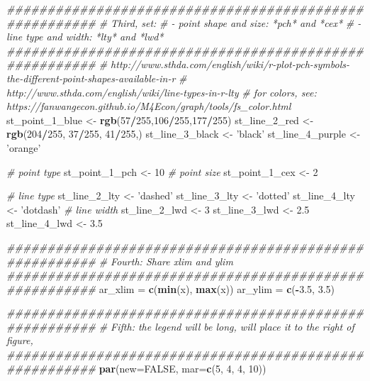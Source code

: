 \documentclass[
]{book}
\newenvironment{Shaded}{\begin{snugshade}}{\end{snugshade}}
\newcommand{\CommentTok}[1]{\textcolor[rgb]{0.56,0.35,0.01}{\textit{#1}}}
\newcommand{\DataTypeTok}[1]{\textcolor[rgb]{0.13,0.29,0.53}{#1}}
\newcommand{\DecValTok}[1]{\textcolor[rgb]{0.00,0.00,0.81}{#1}}
\newcommand{\FloatTok}[1]{\textcolor[rgb]{0.00,0.00,0.81}{#1}}
\newcommand{\KeywordTok}[1]{\textcolor[rgb]{0.13,0.29,0.53}{\textbf{#1}}}
\newcommand{\NormalTok}[1]{#1}
\newcommand{\OperatorTok}[1]{\textcolor[rgb]{0.81,0.36,0.00}{\textbf{#1}}}
\newcommand{\OtherTok}[1]{\textcolor[rgb]{0.56,0.35,0.01}{#1}}
\newcommand{\StringTok}[1]{\textcolor[rgb]{0.31,0.60,0.02}{#1}}
\begin{document}
\begin{Shaded}
\begin{Highlighting}[]
\CommentTok{#######################################################}
\CommentTok{# Third, set:}
\CommentTok{# - point shape and size: *pch* and *cex*}
\CommentTok{# - line type and width: *lty* and *lwd*}
\CommentTok{#######################################################}
\CommentTok{# http://www.sthda.com/english/wiki/r-plot-pch-symbols-the-different-point-shapes-available-in-r}
\CommentTok{# http://www.sthda.com/english/wiki/line-types-in-r-lty}
\CommentTok{# for colors, see: https://fanwangecon.github.io/M4Econ/graph/tools/fs_color.html}
\NormalTok{st_point_}\DecValTok{1}\NormalTok{_blue <-}\StringTok{ }\KeywordTok{rgb}\NormalTok{(}\DecValTok{57}\OperatorTok{/}\DecValTok{255}\NormalTok{,}\DecValTok{106}\OperatorTok{/}\DecValTok{255}\NormalTok{,}\DecValTok{177}\OperatorTok{/}\DecValTok{255}\NormalTok{)}
\NormalTok{st_line_}\DecValTok{2}\NormalTok{_red <-}\StringTok{ }\KeywordTok{rgb}\NormalTok{(}\DecValTok{204}\OperatorTok{/}\DecValTok{255}\NormalTok{, }\DecValTok{37}\OperatorTok{/}\DecValTok{255}\NormalTok{, }\DecValTok{41}\OperatorTok{/}\DecValTok{255}\NormalTok{,)}
\NormalTok{st_line_}\DecValTok{3}\NormalTok{_black <-}\StringTok{ 'black'}
\NormalTok{st_line_}\DecValTok{4}\NormalTok{_purple <-}\StringTok{ 'orange'}

\CommentTok{# point type}
\NormalTok{st_point_}\DecValTok{1}\NormalTok{_pch <-}\StringTok{ }\DecValTok{10}
\CommentTok{# point size}
\NormalTok{st_point_}\DecValTok{1}\NormalTok{_cex <-}\StringTok{ }\DecValTok{2}

\CommentTok{# line type}
\NormalTok{st_line_}\DecValTok{2}\NormalTok{_lty <-}\StringTok{ 'dashed'}
\NormalTok{st_line_}\DecValTok{3}\NormalTok{_lty <-}\StringTok{ 'dotted'}
\NormalTok{st_line_}\DecValTok{4}\NormalTok{_lty <-}\StringTok{ 'dotdash'}
\CommentTok{# line width}
\NormalTok{st_line_}\DecValTok{2}\NormalTok{_lwd <-}\StringTok{ }\DecValTok{3}
\NormalTok{st_line_}\DecValTok{3}\NormalTok{_lwd <-}\StringTok{ }\FloatTok{2.5}
\NormalTok{st_line_}\DecValTok{4}\NormalTok{_lwd <-}\StringTok{ }\FloatTok{3.5}

\CommentTok{#######################################################}
\CommentTok{# Fourth: Share xlim and ylim}
\CommentTok{#######################################################}
\NormalTok{ar_xlim =}\StringTok{ }\KeywordTok{c}\NormalTok{(}\KeywordTok{min}\NormalTok{(x), }\KeywordTok{max}\NormalTok{(x))}
\NormalTok{ar_ylim =}\StringTok{ }\KeywordTok{c}\NormalTok{(}\OperatorTok{-}\FloatTok{3.5}\NormalTok{, }\FloatTok{3.5}\NormalTok{)}

\CommentTok{#######################################################}
\CommentTok{# Fifth: the legend will be long, will place it to the right of figure,}
\CommentTok{#######################################################}
\KeywordTok{par}\NormalTok{(}\DataTypeTok{new=}\OtherTok{FALSE}\NormalTok{, }\DataTypeTok{mar=}\KeywordTok{c}\NormalTok{(}\DecValTok{5}\NormalTok{, }\DecValTok{4}\NormalTok{, }\DecValTok{4}\NormalTok{, }\DecValTok{10}\NormalTok{))}


\end{Highlighting}
\end{Shaded}
\end{document}
